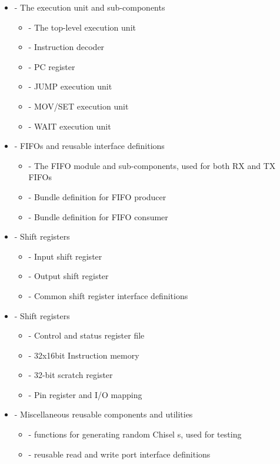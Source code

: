 \begin{itemize}
    \item {} - The execution unit and sub-components
          \begin{itemize}
              \item {} - The top-level execution unit
              \item {} - Instruction decoder
              \item {} - PC register
              \item {} - JUMP execution unit
              \item {} - MOV/SET execution unit
              \item {} - WAIT execution unit
          \end{itemize}
    \item {} - FIFOs and reusable interface definitions
          \begin{itemize}
              \item {} - The FIFO module and sub-components, used for both RX and TX FIFOs
              \item {} - Bundle definition for FIFO producer
              \item {} - Bundle definition for FIFO consumer
          \end{itemize}
    \item {} - Shift registers
          \begin{itemize}
              \item {} - Input shift register
              \item {} - Output shift register
              \item {} - Common shift register interface definitions
          \end{itemize}
    \item {} - Shift registers
          \begin{itemize}
              \item {} - Control and status register file
              \item {} - 32x16bit Instruction memory
              \item {} - 32-bit scratch register
              \item {} - Pin register and I/O mapping
          \end{itemize}
    \item {} - Miscellaneous reusable components and utilities
          \begin{itemize}
              \item {} - functions for generating random Chisel s, used for testing
              \item {} - reusable read and write port interface definitions
          \end{itemize}
\end{itemize}

